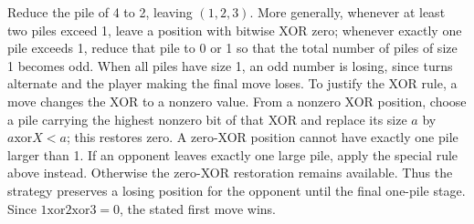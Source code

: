 Reduce the pile of 4 to 2, leaving $(1,2,3)$. More generally, whenever at least two piles exceed 1, leave a position with bitwise XOR zero; whenever exactly one pile exceeds 1, reduce that pile to 0 or 1 so that the total number of piles of size 1 becomes odd. When all piles have size 1, an odd number is losing, since turns alternate and the player making the final move loses. To justify the XOR rule, a move changes the XOR to a nonzero value. From a nonzero XOR position, choose a pile carrying the highest nonzero bit of that XOR and replace its size $a$ by $a\mathbin{\mathrm{xor}}X<a$; this restores zero. A zero-XOR position cannot have exactly one pile larger than 1. If an opponent leaves exactly one large pile, apply the special rule above instead. Otherwise the zero-XOR restoration remains available. Thus the strategy preserves a losing position for the opponent until the final one-pile stage. Since $1\mathbin{\mathrm{xor}}2\mathbin{\mathrm{xor}}3=0$, the stated first move wins.
